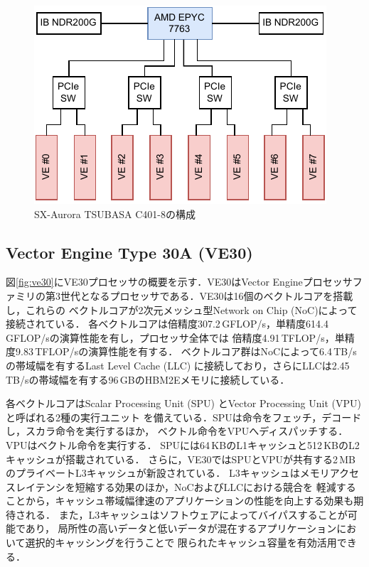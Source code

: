 ﻿\documentclass[submit,techrep,noauthor]{ipsj}
\begin{document}
\begin{figure}[tb]
  \centering
  \includegraphics{figs/node_arch.pdf}
  \caption{SX-Aurora TSUBASA C401-8の構成}\label{fig:node}
\end{figure}

\subsection{Vector Engine Type 30A (VE30)}


図\ref{fig:ve30}にVE30プロセッサの概要を示す．VE30はVector
Engineプロセッサファミリの第3世代となるプロセッサである．VE30は16個のベクトルコアを搭載し，これらの
ベクトルコアが2次元メッシュ型Network on Chip (NoC)によって接続されている．
各ベクトルコアは倍精度307.2\,GFLOP/s，単精度614.4\,GFLOP/sの演算性能を有し，プロセッサ全体では
倍精度4.91\,TFLOP/s，単精度9.83\,TFLOP/sの演算性能を有する．
ベクトルコア群はNoCによって6.4\,TB/sの帯域幅を有するLast Level Cache 
(LLC) に接続しており，さらにLLCは2.45\,TB/sの帯域幅を有する96\,GBのHBM2Eメモリに接続している．

各ベクトルコアはScalar Processing Unit (SPU) とVector Processing Unit (VPU) と呼ばれる2種の実行ユニット
を備えている．SPUは命令をフェッチ，デコードし，スカラ命令を実行するほか，
ベクトル命令をVPUへディスパッチする．VPUはベクトル命令を実行する．
SPUには64\,KBのL1キャッシュと512\,KBのL2キャッシュが搭載されている．
さらに，VE30ではSPUとVPUが共有する2\,MBのプライベートL3キャッシュが新設されている．
L3キャッシュはメモリアクセスレイテンシを短縮する効果のほか，NoCおよびLLCにおける競合を
軽減することから，キャッシュ帯域幅律速のアプリケーションの性能を向上する効果も期待される．
また，L3キャッシュはソフトウェアによってバイパスすることが可能であり，
局所性の高いデータと低いデータが混在するアプリケーションにおいて選択的キャッシングを行うことで
限られたキャッシュ容量を有効活用できる．
\end{document}
